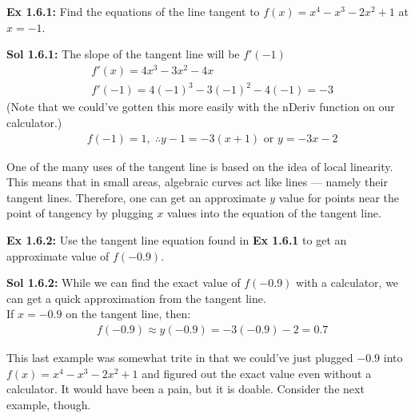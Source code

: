 \begin{tcolorbox}[example]
    \textbf{Ex 1.6.1: } Find the equations of the line tangent to $f(x) = x^4 - x^3 - 2x^2 + 1$ at $x = -1$. 
\end{tcolorbox}
\begin{tcolorbox}[solution]
    \textbf{Sol 1.6.1: } The slope of the tangent line will be $f'(-1)$ \begin{align*}
        & f'(x) = 4x^3 - 3x^2 - 4x \\[11pt]
        & f'(-1) = 4(-1)^3 - 3(-1)^2 - 4(-1) = -3 
    \end{align*} 
    (Note that we could've gotten this more easily with the nDeriv function on our calculator.) \begin{align*}
        & f(-1) = 1, \; \therefore \boxed{y - 1 = -3(x + 1)} \text{ or } \boxed{y = -3x - 2} 
    \end{align*} 
\end{tcolorbox}

One of the many uses of the tangent line is based on the idea of local linearity. This means that in small areas, algebraic curves act like lines --- namely their tangent lines. Therefore, one can get an approximate $y$ value for points near the point of tangency by plugging $x$ values into the equation of the tangent line. \par

\begin{tcolorbox}[example]
    \textbf{Ex 1.6.2: } Use the tangent line equation found in \textbf{Ex 1.6.1} to get an approximate value of $f(-0.9)$. 
\end{tcolorbox}
\begin{tcolorbox}[solution]
    \textbf{Sol 1.6.2: } While we can find the exact value of $f(-0.9)$ with a calculator, we can get a quick approximation from the tangent line. \\[11pt]
    If $x = -0.9$ on the tangent line, then: \begin{align*}
        & f(-0.9) \approx y(-0.9) = -3(-0.9) - 2 = \boxed{0.7}
    \end{align*}
\end{tcolorbox}

This last example was somewhat trite in that we could've just plugged $-0.9$ into $f(x) = x^4 - x^3 - 2x^2 + 1$ and figured out the exact value even without a calculator. It would have been a pain, but it is doable. Consider the next example, though. \par

